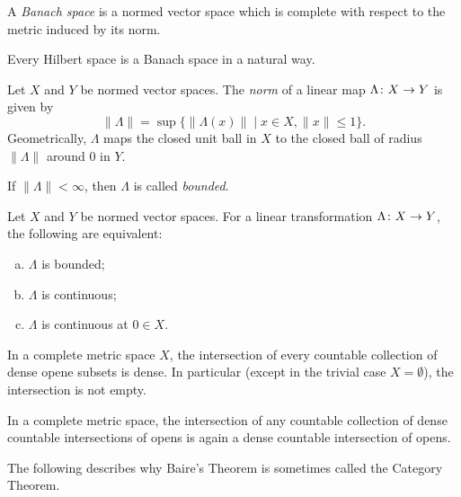 \begin{definition}
  A \emph{Banach space} is a normed vector space which is complete with respect to the metric induced by its norm.
\end{definition}

\begin{remark}
  Every Hilbert space is a Banach space in a natural way.
\end{remark}

\begin{definition}
  Let $X$ and $Y$ be normed vector spaces. The \emph{norm} of a linear map $\Lambda \colon X \rightarrow Y$ is given by
  \[
  \|\Lambda\| = \sup\{ \|\Lambda(x)\| \;|\; x \in X, \|x\| \leq 1 \}.
  \]
Geometrically, $\Lambda$ maps the closed unit ball in $X$ to the closed ball of radius $\|\Lambda\|$ around $0$ in $Y$.
\end{definition}

\begin{definition}
  If $\|\Lambda\| < \infty$, then $\Lambda$ is called \emph{bounded}.
\end{definition}

\begin{theorem}
  Let $X$ and $Y$ be normed vector spaces. For a linear transformation $\Lambda \colon X \rightarrow Y$, the following are equivalent:
  \begin{enumerate}[(a)]
  \item $\Lambda$ is bounded;
  \item $\Lambda$ is continuous;
  \item $\Lambda$ is continuous at $0 \in X$.
  \end{enumerate}
\end{theorem}

\begin{theorem}
  In a complete metric space $X$, the intersection of every countable collection of dense opene subsets is dense. In particular (except in the trivial case $X = \emptyset$), the intersection is not empty.
\end{theorem}

\begin{corollary}
  In a complete metric space, the intersection of any countable collection of dense countable intersections of opens is again a dense countable intersection of opens.
\end{corollary}

The following describes why Baire's Theorem is sometimes called the Category Theorem.

